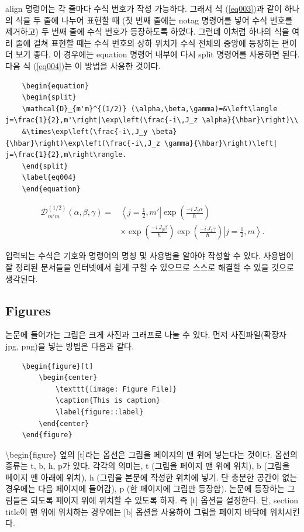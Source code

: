 \documentclass[twoside,11pt]{gshs_thesis}
\begin{document}
align 명령어는 각 줄마다 수식 번호가 작성 가능하다. 그래서 식 (\ref{eq003})과 같이 하나의 식을 두 줄에 나누어 표현할 때 (첫 번째 줄에는 notag 명령어를 넣어 수식 번호를 제거하고) 두 번째 줄에 수식 번호가 등장하도록 하였다. 그런데 이처럼 하나의 식을 여러 줄에 걸쳐 표현할 때는 수식 번호의 상하 위치가 수식 전체의 중앙에 등장하는 편이 더 보기 좋다. 이 경우에는 equation 명령어 내부에 다시 split 명령어를 사용하면 된다. 다음 식 (\ref{eq004})는 이 방법을 사용한 것이다.
\begin{lstlisting}
	\begin{equation}
	\begin{split}
	\mathcal{D}_{m'm}^{(1/2)} (\alpha,\beta,\gamma)=&\left\langle j=\frac{1}{2},m'\right|\exp\left(\frac{-i\,J_z \alpha}{\hbar}\right)\\
	&\times\exp\left(\frac{-i\,J_y \beta}{\hbar}\right)\exp\left(\frac{-i\,J_z \gamma}{\hbar}\right)\left| j=\frac{1}{2},m\right\rangle.
	\end{split}
	\label{eq004}
	\end{equation}
\end{lstlisting}

\begin{equation}
\begin{split}
\mathcal{D}_{m'm}^{(1/2)} (\alpha,\beta,\gamma)=&\left\langle j=\frac{1}{2},m'\right|\exp\left(\frac{-i\,J_z \alpha}{\hbar}\right)\\
&\times\exp\left(\frac{-i\,J_y \beta}{\hbar}\right)\exp\left(\frac{-i\,J_z \gamma}{\hbar}\right)\left| j=\frac{1}{2},m\right\rangle.
\end{split}
\label{eq004}
\end{equation}

 입력되는 수식은 기호와 명령어의 명칭 및 사용법을 알아야 작성할 수 있다. 사용법이 잘 정리된 문서들을 인터넷에서 쉽게 구할 수 있으므로 스스로 해결할 수 있을 것으로 생각된다.


\subsection{Figures}
논문에 들어가는 그림은 크게 사진과 그래프로 나눌 수 있다. 먼저 사진파일(확장자 jpg, png)을 넣는 방법은 다음과 같다.
\begin{lstlisting}
	\begin{figure}[t]
		\begin{center}
			\texttt{[image: Figure File]}
			\caption{This is caption}
			\label{figure::label}
		\end{center}
	\end{figure}
\end{lstlisting}
{\textbackslash}begin\{figure\} 옆의 [t]라는 옵션은 그림을 페이지의 맨 위에 넣는다는 것이다. 옵션의 종류는 t, b, h, p가 있다. 각각의 의미는, t (그림을 페이지 맨 위에 위치), b (그림을 페이지 맨 아래에 위치), h (그림을 본문에 작성한 위치에 넣기. 단 충분한 공간이 없는 경우에는 다음 페이지에 들어감), p (한 페이지에 그림만 등장함). 논문에 등장하는 그림들은 되도록 페이지 위에 위치할 수 있도록 하자. 즉 [t] 옵션을 설정한다. 단, section title이 맨 위에 위치하는 경우에는 [b] 옵션을 사용하여 그림을 페이지 바닥에 위치시킨다.
\end{document}
